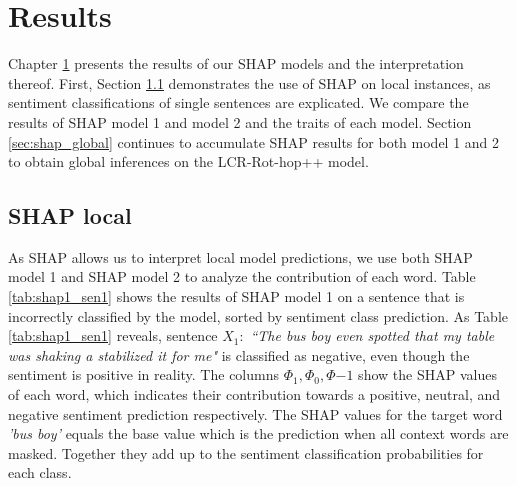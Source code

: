 \chapter{Results}
    \label{chap:results}

Chapter \ref{chap:results} presents the results of our SHAP models and the interpretation thereof. First, Section \ref{sec:shap_local} demonstrates the use of SHAP on local instances, as sentiment classifications of single sentences are explicated. We compare the results of SHAP model 1 and model 2 and the traits of each model. Section \ref{sec:shap_global} continues to accumulate SHAP results for both model 1 and 2 to obtain global inferences on the LCR-Rot-hop++ model. 

\section{SHAP local}
    \label{sec:shap_local}
As SHAP allows us to interpret local model predictions, we use both SHAP model 1 and SHAP model 2 to analyze the contribution of each word. Table \ref{tab:shap1_sen1} shows the results of SHAP model 1 on a sentence that is incorrectly classified by the model, sorted by sentiment class prediction.
As Table \ref{tab:shap1_sen1} reveals, sentence $X_1:$ \textit{``The bus boy even spotted that my table was shaking a stabilized it for me"} is classified as negative, even though the sentiment is positive in reality. The columns $\Phi_1, \Phi_0, \Phi{-1}$ show the SHAP values of each word, which indicates their contribution towards a positive, neutral, and negative sentiment prediction respectively. The SHAP values for the target word \textit{'bus boy'} equals the base value which is the prediction when all context words are masked. Together they add up to the sentiment classification probabilities for each class.

